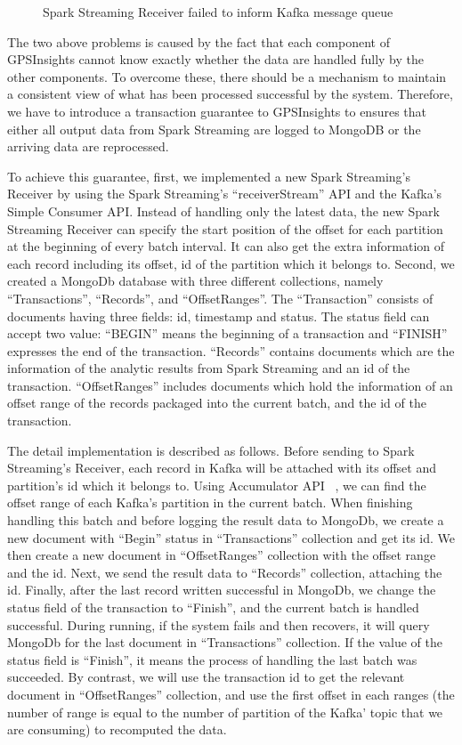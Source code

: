 \documentclass{acm_proc_article-sp}
\begin{document}
\begin{figure}[h]
\centering
{}
\caption{Spark Streaming Receiver failed to inform Kafka message queue}
\label{fig:second-problem}
\end{figure} 

The two above problems is caused by the fact that each component of GPSInsights cannot know exactly whether the data are handled fully by the other components. To overcome these, there should be a mechanism to maintain a consistent view of what has been processed successful by the system. Therefore, we have to introduce a transaction guarantee to GPSInsights to ensures that either all output data from Spark Streaming are logged to MongoDB or the arriving data are reprocessed.

To achieve this guarantee, first, we implemented a new Spark Streaming's Receiver by using the Spark Streaming's ``receiverStream'' API and the Kafka's Simple Consumer API. Instead of handling only the latest data, the new Spark Streaming Receiver can specify the start position of the offset for each partition at the beginning of every batch interval. It can also get the extra information of each record including its offset, id of the partition which it belongs to. Second, we created a MongoDb database with three different collections, namely ``Transactions'', ``Records'', and ``OffsetRanges''. The ``Transaction'' consists of documents having three fields: id, timestamp and status. The status field can accept two value: ``BEGIN'' means the beginning of a transaction and ``FINISH'' expresses the end of the transaction. ``Records'' contains documents which are the information of the analytic results from Spark Streaming and an id of the transaction. ``OffsetRanges'' includes documents which hold the information of an offset range of the records packaged into the current batch, and the id of the transaction.

The detail implementation is described as follows. Before sending to Spark Streaming's Receiver, each record in Kafka will be attached with its offset and partition's id which it belongs to. Using Accumulator API ~\cite{accumulatorapi}, we can find the offset range of each Kafka's partition in the current batch. When finishing handling this batch and before logging the result data to MongoDb, we create a new document with ``Begin'' status in ``Transactions'' collection and get its id. We then create a new document in ``OffsetRanges'' collection with the offset range and the id. Next, we send the result data to ``Records'' collection, attaching the id. Finally, after the last record written successful in MongoDb, we change the status field of the transaction to ``Finish'', and the current batch is handled successful. During running, if the system fails and then recovers, it will query MongoDb for the last document in ``Transactions'' collection.  If the value of the status field is ``Finish'', it means the process of handling the last batch was succeeded. By contrast, we will use the transaction id to get the relevant document in ``OffsetRanges'' collection, and use the first offset in each ranges (the number of range is equal to the number of partition of the Kafka' topic that we are consuming) to recomputed the data. 
\end{document}
